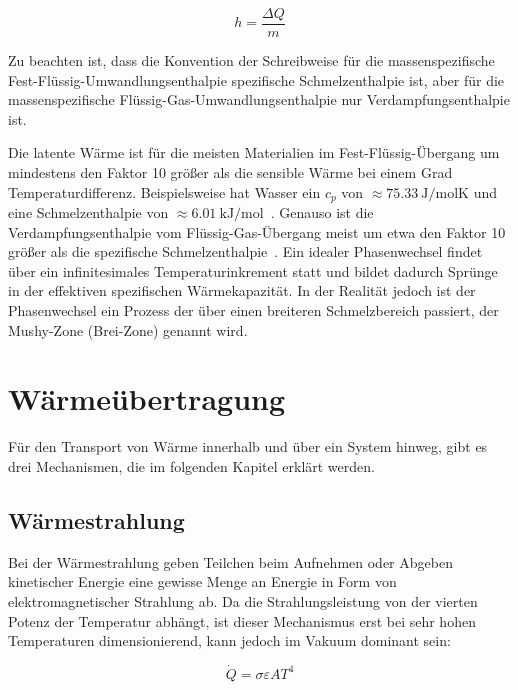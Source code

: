 \begin{equation}
    \label{eq:latente_waerme}
    h = \frac{\Delta Q}{m}
\end{equation}

Zu beachten ist, dass die Konvention der Schreibweise für die massenspezifische Fest-Flüssig-Umwandlungsenthalpie spezifische Schmelzenthalpie ist,
aber für die massenspezifische Flüssig-Gas-Umwandlungsenthalpie nur Verdampfungsenthalpie ist.

Die latente Wärme ist für die meisten Materialien im Fest-Flüssig-Übergang um mindestens den Faktor 10 größer als die sensible Wärme bei
einem Grad Temperaturdifferenz. Beispielsweise hat Wasser ein $c_p$ von $\approx\SI{75,33}{\joule\per\mole\kelvin}$ und eine Schmelzenthalpie von $\approx\SI{6,01}{\kilo\joule\per\mole}$~\cite{Wikipedia-WaterData}.
Genauso ist die Verdampfungsenthalpie vom Flüssig-Gas-Übergang meist um etwa den Faktor 10 größer als die 
spezifische Schmelzenthalpie~\cite{fusion-vaporization}.
Ein idealer Phasenwechsel findet über ein infinitesimales Temperaturinkrement statt und bildet dadurch Sprünge in der effektiven spezifischen Wärmekapazität.
In der Realität jedoch ist der Phasenwechsel ein Prozess der über einen breiteren Schmelzbereich passiert, der Mushy-Zone (Brei-Zone) genannt wird. 

\section{Wärmeübertragung}\label{sec:waermeuebertragung}

Für den Transport von Wärme innerhalb und über ein System hinweg, gibt es drei Mechanismen, die im folgenden Kapitel erklärt werden.

\subsection{Wärmestrahlung}\label{sec:strahlung}

Bei der Wärmestrahlung geben Teilchen beim Aufnehmen oder Abgeben kinetischer Energie eine gewisse Menge an Energie in Form
von elektromagnetischer Strahlung ab. Da die Strahlungsleistung von der vierten Potenz der Temperatur
abhängt, ist dieser Mechanismus erst bei sehr hohen Temperaturen dimensionierend, kann jedoch im Vakuum dominant sein:

\begin{equation}
    \label{eq:radiation}
    \dot{Q}=\sigma\varepsilon A T^{4}
\end{equation}

